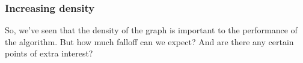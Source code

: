 \documentclass[a4paper]{article}
\begin{document}
% 
% 
% 
% 

\subsubsection{Increasing density}
So, we've seen that the density of the graph is important to the performance of the algorithm. But how much falloff can we expect? And are there any certain points of extra interest?
\end{document}
